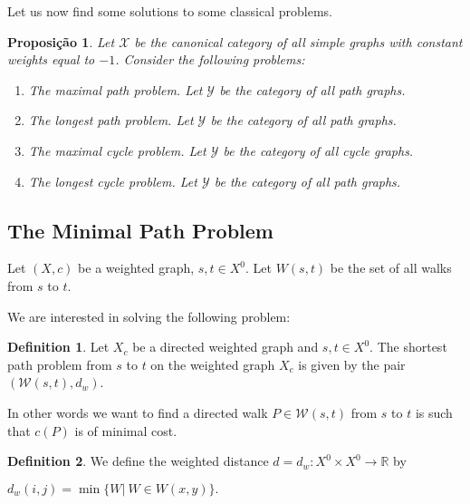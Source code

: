 \documentclass[]{article}
\newtheorem{proposition}{Proposição}[section]
\theoremstyle{definition}
\newtheorem{definition}{Definition}[section]
\theoremstyle{definition}
\newcommand{\raw}{\rightarrow}
\newcommand{\bb}{\mathbb}
\newcommand{\cax}{\mathcal{X}}
\newcommand{\cay}{\mathcal{Y}}
\begin{document}
Let us now find some solutions to some classical problems. 

\begin{proposition}
	Let $\cax$ be the canonical category of all simple graphs with constant weights equal to $-1$. Consider the following problems:
	
	\begin{enumerate}
		\item The maximal path problem. Let $\cay$ be the category of all path graphs. 
		
		\item The longest path problem. Let $\cay$ be the category of all path graphs. 

		\item The maximal cycle problem. Let $\cay$ be the category of all cycle graphs. 

		\item The longest cycle problem. Let $\cay$ be the category of all path graphs. 

	\end{enumerate}
\end{proposition}

 

\subsection{The Minimal Path Problem}

Let $(X, c)$ be a weighted graph, $s, t \in X^0$. Let $W(s, t)$ be the set of all walks from $s$ to $t$. 

We are interested in solving the following problem:

\begin{definition}
	Let $X_c$ be a directed weighted graph and $s, t \in X^0$. The shortest path problem from $s$ to $t$ on the weighted graph $X_c$ is given by the pair $(\mathcal{W}(s, t), d_w)$. 
\end{definition} 

In other words we want to find a directed walk $P \in \mathcal{W}(s, t)$ from $s$ to $t$ is such that $c(P)$ is of minimal cost.

\begin{definition}
	We define the weighted distance $d = d_w:X^0 \times X^0 \raw \bb{R}$ by 
	
	\begin{center}
		$d_w(i, j) = \min\{W |\ W \in W(x, y) \}.$
	\end{center}
\end{definition}
\end{document}
